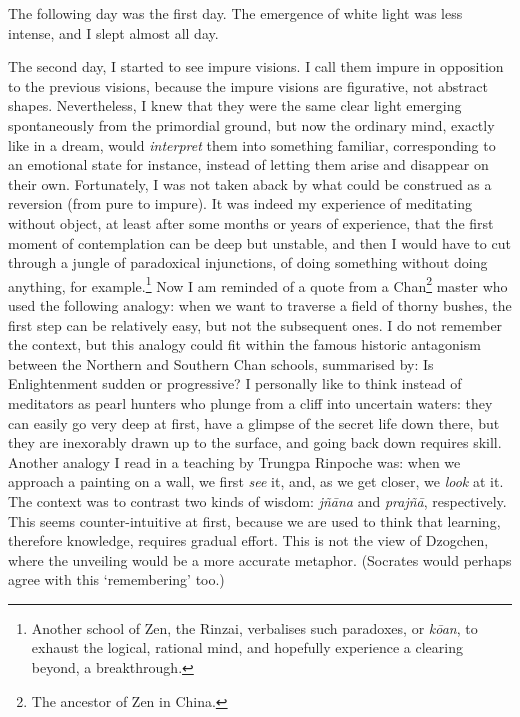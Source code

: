 \documentclass[11pt,twocolumn]{article}
\begin{document}
The following day was the first day. The emergence of white light was
less intense, and I slept almost all day.

The second day, I started to see impure visions. I call them impure in
opposition to the previous visions, because the impure visions are
figurative, not abstract shapes. Nevertheless, I knew that they were
the same clear light emerging spontaneously from the primordial
ground, but now the ordinary mind, exactly like in a dream, would
\emph{interpret} them into something familiar, corresponding to an
emotional state for instance, instead of letting them arise and
disappear on their own. Fortunately, I was not taken aback by what
could be construed as a reversion (from pure to impure). It was indeed
my experience of meditating without object, at least after some months
or years of experience, that the first moment of contemplation can be
deep but unstable, and then I would have to cut through a jungle of
paradoxical injunctions, of doing something without doing anything,
for example.\footnote{Another school of Zen, the Rinzai, verbalises
such paradoxes, or \emph{kōan}, to exhaust the logical, rational mind,
and hopefully experience a clearing beyond, a breakthrough.} Now I am
reminded of a quote from a Chan\footnote{The ancestor of Zen in
China.} master who used the following analogy: when we want to
traverse a field of thorny bushes, the first step can be relatively
easy, but not the subsequent ones. I do not remember the context, but
this analogy could fit within the famous historic antagonism between
the Northern and Southern Chan schools, summarised by: Is
Enlightenment sudden or progressive?  I personally like to think
instead of meditators as pearl hunters who plunge from a cliff into
uncertain waters: they can easily go very deep at first, have a
glimpse of the secret life down there, but they are inexorably drawn
up to the surface, and going back down requires skill. Another analogy
I read in a teaching by Trungpa Rinpoche was: when we approach a
painting on a wall, we first \emph{see} it, and, as we get closer, we
\emph{look} at it. The context was to contrast two kinds of wisdom:
\emph{jñāna} and \emph{prajñā}, respectively. This seems
counter\hyp{}intuitive at first, because we are used to think that
learning, therefore knowledge, requires gradual effort. This is not
the view of Dzogchen, where the unveiling would be a more accurate
metaphor. (Socrates would perhaps agree with this `remembering' too.)
\end{document}

